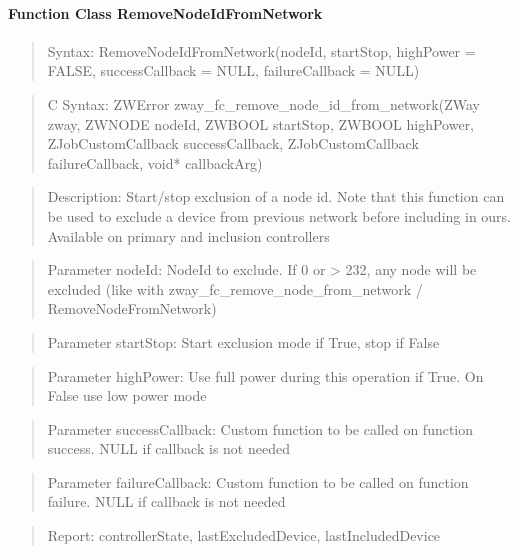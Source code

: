 \paragraph{Function Class RemoveNodeIdFromNetwork}
\begin{quote}Syntax: RemoveNodeIdFromNetwork(nodeId, startStop, highPower = FALSE, successCallback = NULL, failureCallback = NULL)\end{quote}
\begin{quote}C Syntax: ZWError zway\_fc\_remove\_node\_id\_from\_network(ZWay zway, ZWNODE nodeId, ZWBOOL startStop, ZWBOOL highPower, ZJobCustomCallback successCallback, ZJobCustomCallback failureCallback, void* callbackArg)\end{quote}
\begin{quote}Description: Start/stop exclusion of a node id. Note that this function can be used to exclude a device from previous network before including in ours. Available on primary and inclusion controllers\end{quote}
\begin{quote}Parameter nodeId: NodeId to exclude. If 0 or > 232, any node will be excluded (like with zway\_fc\_remove\_node\_from\_network / RemoveNodeFromNetwork)\end{quote}
\begin{quote}Parameter startStop: Start exclusion mode if True, stop if False\end{quote}
\begin{quote}Parameter highPower: Use full power during this operation if True. On False use low power mode\end{quote}
\begin{quote}Parameter successCallback: Custom function to be called on function success. NULL if callback is not needed\end{quote}
\begin{quote}Parameter failureCallback: Custom function to be called on function failure. NULL if callback is not needed\end{quote}
\begin{quote}Report: controllerState, lastExcludedDevice, lastIncludedDevice\end{quote}

